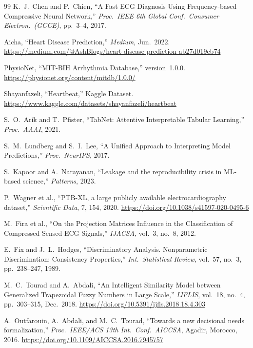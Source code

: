 \documentclass[10pt, twocolumn]{article}
\begin{document}
\begin{thebibliography}{99}
K.\ J.\ Chen and P.\ Chien,
``A Fast ECG Diagnosis Using Frequency-based Compressive Neural Network,''
\textit{Proc.\ IEEE 6th Global Conf.\ Consumer Electron.\ (GCCE)}, pp.~3--4, 2017.

Aicha,
``Heart Disease Prediction,''
\textit{Medium}, Jun.\ 2022.
\url{https://medium.com/@AshBlogs/heart-disease-prediction-ab27d019eb74}

PhysioNet,
``MIT-BIH Arrhythmia Database,'' version~1.0.0.
\url{https://physionet.org/content/mitdb/1.0.0/}

Shayanfazeli,
``Heartbeat,'' Kaggle Dataset.
\url{https://www.kaggle.com/datasets/shayanfazeli/heartbeat}

S.\ O.\ Arik and T.\ Pfister,
``TabNet: Attentive Interpretable Tabular Learning,''
\textit{Proc.\ AAAI}, 2021.

S.\ M.\ Lundberg and S.\ I.\ Lee,
``A Unified Approach to Interpreting Model Predictions,''
\textit{Proc.\ NeurIPS}, 2017.

S.\ Kapoor and A.\ Narayanan,
``Leakage and the reproducibility crisis in ML-based science,''
\textit{Patterns}, 2023.

P.\ Wagner et al.,
``PTB-XL, a large publicly available electrocardiography dataset,''
\textit{Scientific Data}, 7, 154, 2020.
\url{https://doi.org/10.1038/s41597-020-0495-6}

M.\ Fira et al.,
``On the Projection Matrices Influence in the Classification of Compressed Sensed ECG Signals,''
\textit{IJACSA}, vol.~3, no.~8, 2012.

E.\ Fix and J.\ L.\ Hodges,
``Discriminatory Analysis. Nonparametric Discrimination: Consistency Properties,''
\textit{Int.\ Statistical Review}, vol.~57, no.~3, pp.~238--247, 1989.

M.\ C.\ Tourad and A.\ Abdali,
``An Intelligent Similarity Model between Generalized Trapezoidal Fuzzy Numbers in Large Scale,''
\textit{IJFLIS}, vol.~18, no.~4, pp.~303--315, Dec.\ 2018.
\url{https://doi.org/10.5391/ijfis.2018.18.4.303}

A.\ Outfarouin, A.\ Abdali, and M.\ C.\ Tourad,
``Towards a new decisional needs formalization,''
\textit{Proc.\ IEEE/ACS 13th Int.\ Conf.\ AICCSA}, Agadir, Morocco, 2016.
\url{https://doi.org/10.1109/AICCSA.2016.7945757}

\end{thebibliography}
\end{document}
